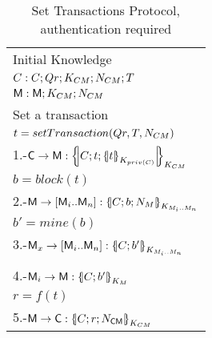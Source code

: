 \begin{table}[htb]
\footnotesize
\begin{center}
\caption{Set Transactions Protocol, authentication required}
\label{table:ProtSetTrans}
\begin{tabular}{|l|}
\hline
           Initial Knowledge                                                             \\
            $C:C; Qr ;  K_{CM} ; N_{CM} ; T$               \\
            $\textsf{M}: \textsf{M}; K_{CM} ; N_{CM}$    \\ \hline \hline 
           Set a transaction                                                                        \\
           \hspace{5mm} $t=setTransaction(Qr,T,N_{CM})$                                  \\  
           1.-$\Client\rightarrow \Server: \fat{C \lnk t \lnk \fat{t}_{K_{priv(C)}}}_{K_{\client\serverW}}$          \\ 
           \hspace{5mm} $b=block(t)$                                  \\  
           2.-$\Server\rightarrow [\Server_i .. \Server_n]: \fat{C \lnk b \lnk N_\serverW}_{K_{\serverW_i .. \serverW_n}}$          \\ 
           \hspace{5mm} $b'=mine(b)$                                  \\  
           3.-$\Server_x\rightarrow [\Server_i .. \Server_n]: \fat{C \lnk b'}_{K_{\serverW_i .. \serverW_n}}$          \\            
                                             \\  
           4.-$\Server_i\rightarrow \Server: \fat{C \lnk b'}_{K_{\serverW}}$          \\            
           \hspace{5mm} $r=f(t)$                                  \\  
           5.-$\Server\rightarrow \Client: \fat{C \lnk r \lnk N_{\Client\Server}}_{K_{\client\serverW}}$       \\  \hline \hline
\end{tabular}
\end{center}
\end{table}
\normalsize
